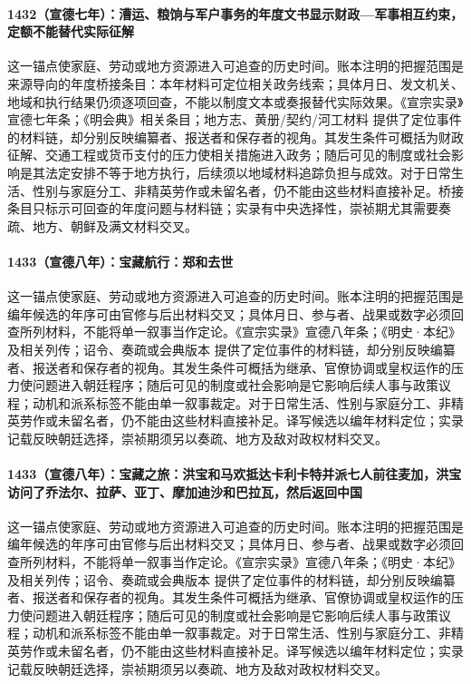 \paragraph{1432（宣德七年）：漕运、粮饷与军户事务的年度文书显示财政—军事相互约束，定额不能替代实际征解} 这一锚点使家庭、劳动或地方资源进入可追查的历史时间。账本注明的把握范围是来源导向的年度桥接条目：本年材料可定位相关政务线索；具体月日、发文机关、地域和执行结果仍须逐项回查，不能以制度文本或奏报替代实际效果。《宣宗实录》宣德七年条；《明会典》相关条目；地方志、黄册/契约/河工材料 提供了定位事件的材料链，却分别反映编纂者、报送者和保存者的视角。其发生条件可概括为财政征解、交通工程或货币支付的压力使相关措施进入政务；随后可见的制度或社会影响是其法定安排不等于地方执行，后续须以地域材料追踪负担与成效。对于日常生活、性别与家庭分工、非精英劳作或未留名者，仍不能由这些材料直接补足。桥接条目只标示可回查的年度问题与材料链；实录有中央选择性，崇祯期尤其需要奏疏、地方、朝鲜及满文材料交叉。

\paragraph{1433（宣德八年）：宝藏航行：郑和去世} 这一锚点使家庭、劳动或地方资源进入可追查的历史时间。账本注明的把握范围是编年候选的年序可由官修与后出材料交叉；具体月日、参与者、战果或数字必须回查所列材料，不能将单一叙事当作定论。《宣宗实录》宣德八年条；《明史·本纪》及相关列传；诏令、奏疏或会典版本 提供了定位事件的材料链，却分别反映编纂者、报送者和保存者的视角。其发生条件可概括为继承、官僚协调或皇权运作的压力使问题进入朝廷程序；随后可见的制度或社会影响是它影响后续人事与政策议程；动机和派系标签不能由单一叙事裁定。对于日常生活、性别与家庭分工、非精英劳作或未留名者，仍不能由这些材料直接补足。译写候选以编年材料定位；实录记载反映朝廷选择，崇祯期须另以奏疏、地方及敌对政权材料交叉。

\paragraph{1433（宣德八年）：宝藏之旅：洪宝和马欢抵达卡利卡特并派七人前往麦加，洪宝访问了乔法尔、拉萨、亚丁、摩加迪沙和巴拉瓦，然后返回中国} 这一锚点使家庭、劳动或地方资源进入可追查的历史时间。账本注明的把握范围是编年候选的年序可由官修与后出材料交叉；具体月日、参与者、战果或数字必须回查所列材料，不能将单一叙事当作定论。《宣宗实录》宣德八年条；《明史·本纪》及相关列传；诏令、奏疏或会典版本 提供了定位事件的材料链，却分别反映编纂者、报送者和保存者的视角。其发生条件可概括为继承、官僚协调或皇权运作的压力使问题进入朝廷程序；随后可见的制度或社会影响是它影响后续人事与政策议程；动机和派系标签不能由单一叙事裁定。对于日常生活、性别与家庭分工、非精英劳作或未留名者，仍不能由这些材料直接补足。译写候选以编年材料定位；实录记载反映朝廷选择，崇祯期须另以奏疏、地方及敌对政权材料交叉。

